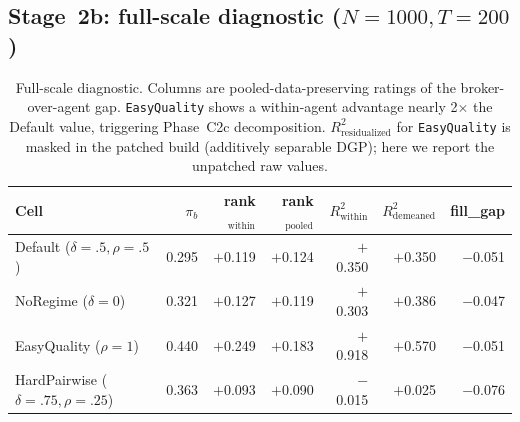 \documentclass[11pt,a4paper]{article}
\begin{document}
\subsection{Stage~2b: full-scale diagnostic ($N{=}1000, T{=}200$)}
\begin{table}[h]\centering\small
\caption{Full-scale diagnostic. Columns are pooled-data-preserving ratings of the broker-over-agent gap. \texttt{EasyQuality} shows a within-agent advantage nearly 2$\times$ the Default value, triggering Phase~C2c decomposition. $R^2_{\text{residualized}}$ for \texttt{EasyQuality} is masked in the patched build (additively separable DGP); here we report the unpatched raw values.}
\label{tab:c2b}
\begin{tabular}{@{}lrrrrrr@{}}
\toprule
Cell & $\pi_b$ & rank$_{\text{within}}$ & rank$_{\text{pooled}}$ & $R^2_{\text{within}}$ & $R^2_{\text{demeaned}}$ & fill\_gap \\
\midrule
Default ($\delta{=}.5,\rho{=}.5$)       & 0.295 & $+$0.119 & $+$0.124 & $+$0.350 & $+$0.350 & $-$0.051 \\
NoRegime ($\delta{=}0$)                  & 0.321 & $+$0.127 & $+$0.119 & $+$0.303 & $+$0.386 & $-$0.047 \\
EasyQuality ($\rho{=}1$)                 & 0.440 & $+$0.249 & $+$0.183 & $+$0.918 & $+$0.570 & $-$0.051 \\
HardPairwise ($\delta{=}.75,\rho{=}.25$) & 0.363 & $+$0.093 & $+$0.090 & $-$0.015 & $+$0.025 & $-$0.076 \\
\bottomrule
\end{tabular}
\end{table}
\end{document}
